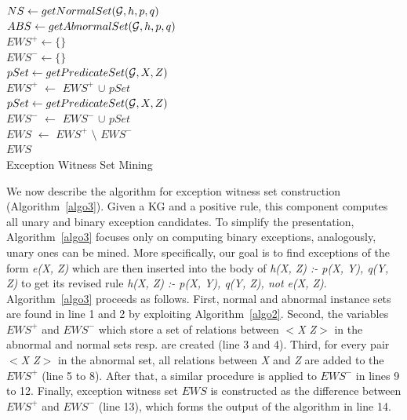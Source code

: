 \IncMargin{1.5em}
\begin{algorithm}[h]
\DontPrintSemicolon
\SetAlgoLined
{}
\BlankLine
$NS \leftarrow getNormalSet(\mathcal{G}, h, p, q)$\\
$ABS \leftarrow getAbnormalSet(\mathcal{G}, h, p, q)$\\
$EWS^+ \leftarrow \{\}$\\
$EWS^- \leftarrow \{\}$\\
\BlankLine
{} {
	$pSet \leftarrow getPredicateSet(\mathcal{G}, X, Z)$\\
	$EWS^+$ $\leftarrow$ $EWS^+$ $\cup$ $pSet$\\
}
 {
	$pSet \leftarrow getPredicateSet(\mathcal{G}, X, Z)$\\
	$EWS^-$ $\leftarrow$ $EWS^-$ $\cup$ $pSet$\\
}
$EWS$ $\leftarrow$ $EWS^+$ $\setminus$ $EWS^-$\\
\Return $EWS$\\
\caption{Exception Witness Set Mining}
\label{algo3}
\end{algorithm}
\DecMargin{1.5em}

We now describe the algorithm for exception witness set construction (Algorithm~\ref{algo3}). Given a KG and a positive rule, this component computes all unary and binary exception candidates. To simplify the presentation, Algorithm~\ref{algo3} focuses only on computing binary exceptions, analogously, unary ones can be mined. More specifically, our goal is to find exceptions of the form \textit{e(X, Z)} which are then inserted into the body of \textit{h(X, Z) :- p(X, Y), q(Y, Z)} to get its revised rule \textit{h(X, Z) :- p(X, Y), q(Y, Z), not e(X, Z)}. Algorithm~\ref{algo3} proceeds as follows. First, normal and abnormal instance sets are found in line 1 and 2 by exploiting Algorithm~\ref{algo2}. Second, the variables $EWS^+$ and $EWS^-$ which store a set of relations between \textit{$<$X Z$>$} in the abnormal and normal sets resp. are created (line 3 and 4). Third, for every pair \textit{$<$X Z$>$} in the abnormal set, all relations between \textit{X} and \textit{Z} are added to the $EWS^+$ (line 5 to 8). After that, a similar procedure is applied to $EWS^-$ in lines 9 to 12. Finally, exception witness set $EWS$ is constructed as the difference between $EWS^+$ and $EWS^-$ (line 13), which forms the output of the algorithm in line 14.


